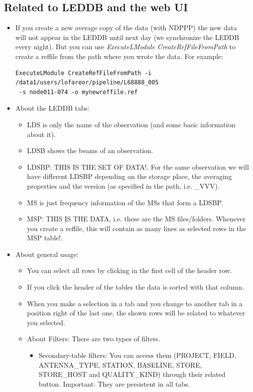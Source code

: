 \documentclass[a4paper,11pt]{article}
\begin{document}
\subsection{Related to LEDDB and the web UI}

\begin{itemize}
\item If you create a new average copy of the data (with NDPPP) the new data will not appear in the LEDDB until next day (we synchronize the LEDDB every night).
    But you can use \textit{ExecuteLModule CreateRefFileFromPath} to create a reffile from the path where you wrote the data. For example:
    \begin{verbatim}    
ExecuteLModule CreateRefFileFromPath -i /data1/users/lofareor/pipeline/L68888_005
 -s node011-074 -o mynewreffile.ref
    \end{verbatim}
\item About the LEDDB tabs:
\begin{itemize}
\item LDS is only the name of the observation (and some basic information about it).
\item LDSB shows the beams of an observation.
\item LDSBP: THIS IS THE SET OF DATA!. For the same observation we will have different LDSBP depending on the storage place, the averaging properties and the version (as specified in the path, i.e. \_VVV).
\item MS is just frequency information of the MSs that form a LDSBP.
\item MSP: THIS IS THE DATA, i.e. these are the MS files/folders. Whenever you create a reffile, this will contain as many lines as selected rows in the MSP table!.
\end{itemize}
\item About general usage:
\begin{itemize}
\item You can select all rows by clicking in the first cell of the header row.
\item If you click the header of the tables the data is sorted with that column.
\item When you make a selection in a tab and you change to another tab in a position right of the last one, the shown rows will be related to whatever you selected.
\item About Filters: There are two types of filters.
\begin{itemize}
\item Secondary-table filters: You can access them (PROJECT, FIELD, ANTENNA\_TYPE, STATION, BASELINE, STORE, STORE\_HOST and QUALITY\_KIND) through their related button. Important: They are persistent in all tabs. 

\end{itemize}
\end{itemize}
\end{itemize}
\end{document}
